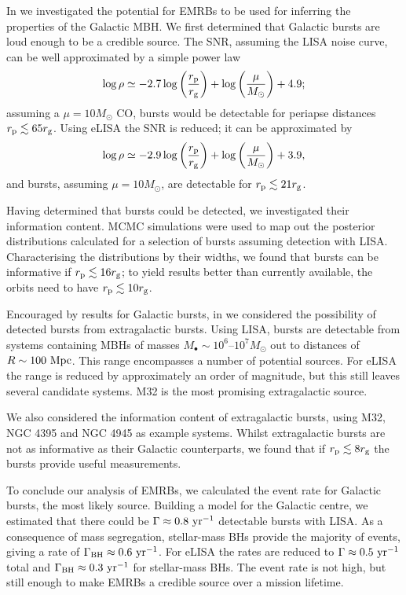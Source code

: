 In  we investigated the potential for EMRBs to be used for inferring the properties of the Galactic MBH. We first determined that Galactic bursts are loud enough to be a credible source. The SNR, assuming the LISA noise curve, can be well approximated by a simple power law
\begin{equation}
\log\rho \simeq -2.7\log\left(\dfrac{r_\mathrm{p}}{r_\mathrm{g}}\right) + \log\left(\dfrac{\mu}{M_\odot}\right) + 4.9;
\end{equation}
assuming a $\mu = 10 M_\odot$ CO, bursts would be detectable for periapse distances $r_\mathrm{p} \lesssim 65 r_\mathrm{g}$. Using eLISA the SNR is reduced; it can be approximated by 
\begin{equation}
\log\rho \simeq -2.9\log\left(\dfrac{r_\mathrm{p}}{r_\mathrm{g}}\right) + \log\left(\dfrac{\mu}{M_\odot}\right) + 3.9,
\end{equation}
and bursts, assuming $\mu = 10 M_\odot$, are detectable for $r_\mathrm{p} \lesssim 21 r_\mathrm{g}$.

Having determined that bursts could be detected, we investigated their information content. MCMC simulations were used to map out the posterior distributions calculated for a selection of bursts assuming detection with LISA. Characterising the distributions by their widths, we found that bursts can be informative if $r_\mathrm{p} \lesssim 16 r_\mathrm{g}$; to yield results better than currently available, the orbits need to have $r_\mathrm{p} \lesssim 10 r_\mathrm{g}$.

Encouraged by results for Galactic bursts, in  we considered the possibility of detected bursts from extragalactic bursts. Using LISA, bursts are detectable from systems containing MBHs of masses $M_\bullet \sim 10^6$--$10^7 M_\odot$ out to distances of $R \sim 100~\mathrm{Mpc}$. This range encompasses a number of potential sources. For eLISA the range is reduced by approximately an order of magnitude, but this still leaves several candidate systems. M32 is the most promising extragalactic source.

We also considered the information content of extragalactic bursts, using M32, NGC 4395 and NGC 4945 as example systems. Whilst extragalactic bursts are not as informative as their Galactic counterparts, we found that if $r_\mathrm{p} \lesssim 8 r_\mathrm{g}$ the bursts provide useful measurements.

To conclude our analysis of EMRBs, we calculated the event rate for Galactic bursts, the most likely source. Building a model for the Galactic centre, we estimated that there could be $\Gamma \approx 0.8~\mathrm{yr^{-1}}$ detectable bursts with LISA. As a consequence of mass segregation, stellar-mass BHs provide the majority of events, giving a rate of $\Gamma_\mathrm{BH} \approx 0.6~\mathrm{yr^{-1}}$. For eLISA the rates are reduced to $\Gamma \approx 0.5~\mathrm{yr^{-1}}$ total and $\Gamma_\mathrm{BH} \approx 0.3~\mathrm{yr^{-1}}$ for stellar-mass BHs. The event rate is not high, but still enough to make EMRBs a credible source over a mission lifetime.

